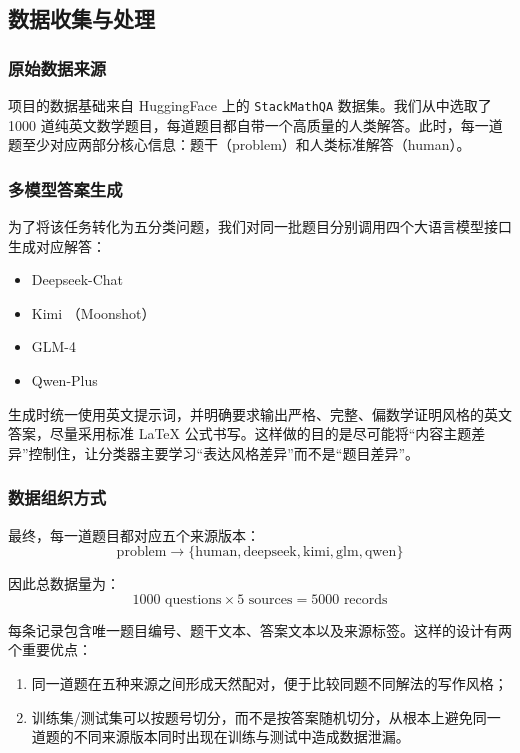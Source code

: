 \documentclass[11pt, a4paper]{ctexart}
\begin{document}
\subsection{数据收集与处理}

\subsubsection{原始数据来源}
项目的数据基础来自 HuggingFace 上的 \texttt{StackMathQA} 数据集。我们从中选取了 1000 道纯英文数学题目，每道题目都自带一个高质量的人类解答。此时，每一道题至少对应两部分核心信息：题干（problem）和人类标准解答（human）。

\subsubsection{多模型答案生成}
为了将该任务转化为五分类问题，我们对同一批题目分别调用四个大语言模型接口生成对应解答：
\begin{itemize}
    \item Deepseek-Chat
    \item Kimi （Moonshot）
    \item GLM-4
    \item Qwen-Plus
\end{itemize}

生成时统一使用英文提示词，并明确要求输出严格、完整、偏数学证明风格的英文答案，尽量采用标准 LaTeX 公式书写。这样做的目的是尽可能将“内容主题差异”控制住，让分类器主要学习“表达风格差异”而不是“题目差异”。

\subsubsection{数据组织方式}
最终，每一道题目都对应五个来源版本：
\[
\text{problem} \rightarrow \{\text{human}, \text{deepseek}, \text{kimi}, \text{glm}, \text{qwen}\}
\]

因此总数据量为：
\[
1000 \text{ questions} \times 5 \text{ sources} = 5000 \text{ records}
\]

每条记录包含唯一题目编号、题干文本、答案文本以及来源标签。这样的设计有两个重要优点：
\begin{enumerate}
    \item 同一道题在五种来源之间形成天然配对，便于比较同题不同解法的写作风格；
    \item 训练集/测试集可以按题号切分，而不是按答案随机切分，从根本上避免同一道题的不同来源版本同时出现在训练与测试中造成数据泄漏。
\end{enumerate}
\end{document}
